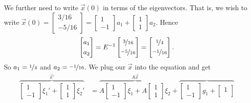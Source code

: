\begin{example}
We further need to write $\vec{x}(0)$ in terms of the eigenvectors.
That is, we wish to write $\vec{x}(0) = 
\left[ \begin{smallmatrix}
3/16 \\
-5/16
\end{smallmatrix} \right] = 
\left[ \begin{smallmatrix}
1 \\
-1
\end{smallmatrix} \right] a_1 +
\left[ \begin{smallmatrix}
1 \\
1
\end{smallmatrix} \right] a_2$.  Hence
\begin{equation*}
\begin{bmatrix}
a_1 \\
\noalign{\smallskip}
a_2
\end{bmatrix} = 
E^{-1}
\begin{bmatrix}
\nicefrac{3}{16} \\
\noalign{\smallskip}
\nicefrac{-5}{16}
\end{bmatrix}
=
\begin{bmatrix}
\nicefrac{1}{4} \\
\noalign{\smallskip}
\nicefrac{-1}{16}
\end{bmatrix} .
\end{equation*}
So $a_1 = \nicefrac{1}{4}$ and $a_2 = \nicefrac{-1}{16}$.
We plug our $\vec{x}$ into the equation and get
\begin{equation*}
\begin{split}
\overbrace{
\begin{bmatrix}
1 \\
-1
\end{bmatrix} \xi_1' +
\begin{bmatrix}
1 \\
1
\end{bmatrix} \xi_2'
}^{\vec{x}'}
& =
\overbrace{
A
\begin{bmatrix}
1 \\
-1
\end{bmatrix} \xi_1 +
A
\begin{bmatrix}
1 \\
1
\end{bmatrix} \xi_2
}^{A\vec{x}}
+
\overbrace{
\begin{bmatrix}
1 \\
-1
\end{bmatrix} g_1 +
\begin{bmatrix}
1 \\

\end{bmatrix}}
\end{split}
\end{equation*}
\end{example}
